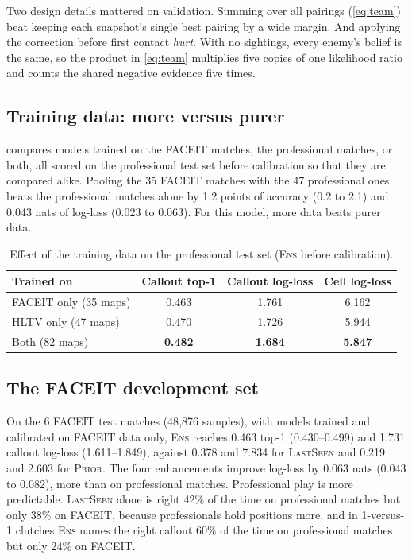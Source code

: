 \documentclass[11pt]{article}
\newcommand{\model}[1]{\textsc{#1}}
\newcommand{\ci}[2]{{\scriptsize(#1--#2)}}
\newcommand{\1}{\mathbb{1}}
\begin{document}
Two design details mattered on validation. Summing over all pairings (\cref{eq:team}) beat keeping each snapshot's single best pairing by a wide margin. And applying the correction before first contact \emph{hurt}. With no sightings, every enemy's belief is the same, so the product in \cref{eq:team} multiplies five copies of one likelihood ratio and counts the shared negative evidence five times.

\subsection{Training data: more versus purer}
\label{sec:res-data}
 compares models trained on the FACEIT matches, the professional matches, or both, all scored on the professional test set before calibration so that they are compared alike. Pooling the 35 FACEIT matches with the 47 professional ones beats the professional matches alone by 1.2 points of accuracy (0.2 to 2.1) and 0.043 nats of log-loss (0.023 to 0.063). For this model, more data beats purer data.

\begin{table}[t]
\centering
\caption{Effect of the training data on the professional test set (\model{Ens} before calibration).}
\label{tab:sources}
\small
\begin{tabular}{@{}lccc@{}}
\toprule
Trained on & Callout top-1 & Callout log-loss & Cell log-loss \\
\midrule
FACEIT only (35 maps) & 0.463 & 1.761 & 6.162 \\
HLTV only (47 maps) & 0.470 & 1.726 & 5.944 \\
Both (82 maps) & \textbf{0.482} & \textbf{1.684} & \textbf{5.847} \\
\bottomrule
\end{tabular}
\end{table}

\subsection{The FACEIT development set}
\label{sec:res-faceit}
On the 6 FACEIT test matches (48{,}876 samples), with models trained and calibrated on FACEIT data only, \model{Ens} reaches 0.463 top-1 \ci{0.430}{0.499} and 1.731 callout log-loss \ci{1.611}{1.849}, against 0.378 and 7.834 for \model{LastSeen} and 0.219 and 2.603 for \model{Prior}. The four enhancements improve log-loss by 0.063 nats (0.043 to 0.082), more than on professional matches. Professional play is more predictable. \model{LastSeen} alone is right 42\% of the time on professional matches but only 38\% on FACEIT, because professionals hold positions more, and in 1-versus-1 clutches \model{Ens} names the right callout 60\% of the time on professional matches but only 24\% on FACEIT.
\end{document}
